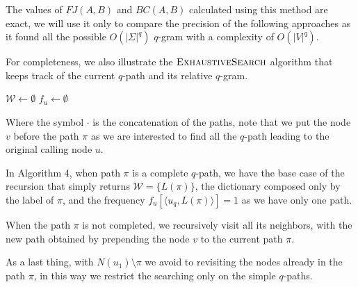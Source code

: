 The values of $FJ(A,B)$ and $BC(A,B)$ calculated using this method are exact, we will use it only to compare the precision of the following approaches as it found all the possible $O(|\Sigma|^{q})$ $q$-gram with a complexity of $O(|V|^{q})$.\medskip
	
For completeness, we also illustrate the $\textsc{ExhaustiveSearch}$ algorithm that keeps track of the current $q$-path and its relative $q$-gram.
	
\begin{algorithm}[h]
	\small
	\DontPrintSemicolon
	\BlankLine
	$\mathcal{W} \gets \emptyset$\;
	$f_{u} \gets \emptyset$ \quad \;    
	\BlankLine
	\BlankLine
	\caption{$\textsc{ExhaustiveSearch}$}
	\label{alg:exhaustive-search}
\end{algorithm}

Where the symbol $\cdot$ is the concatenation of the paths, note that we put the node $v$ before the path $\pi$ as we are interested to find all the $q$-path leading to the original calling node $u$.\medskip
	
In Algorithm 4, when path $\pi$ is a complete $q$-path, we have the base case of the recursion that simply returns $\mathcal{W} = \{ L(\pi) \}$, the dictionary composed only by the label of $\pi$, and the frequency $f_{u}[\langle u_{q}, L(\pi) \rangle] = 1$ as we have only one path.
	
When the path $\pi$ is not completed, we recursively visit all its neighbors, with the new path obtained by prepending the node $v$ to the current path $\pi$.\medskip
	
\clearpage
	
As a last thing, with $N(u_{1}) \setminus \pi$ we avoid to revisiting the nodes already in the path $\pi$, in this way we restrict the searching only on the simple $q$-paths.
	

